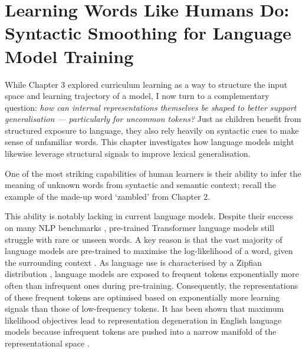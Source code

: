 \chapter{Learning Words Like Humans Do: Syntactic Smoothing for Language Model Training}
\label{chapter:syntactic-smoothing}

While Chapter 3 explored curriculum learning as a way to structure the input space and learning trajectory of a model, I now turn to a complementary question: \emph{how can internal representations themselves be shaped to better support generalisation --- particularly for uncommon tokens?} Just as children benefit from structured exposure to language, they also rely heavily on syntactic cues to make sense of unfamiliar words. This chapter investigates how language models might likewise leverage structural signals to improve lexical generalisation.

One of the most striking capabilities of human learners is their ability to infer the meaning of unknown words from syntactic and semantic context; recall the example of the made-up word `zambled' from Chapter 2.


This ability is notably lacking in current language models. Despite their success on many NLP benchmarks \citep{touvron2023llama, chowdhery2023palm}, pre-trained Transformer language models still struggle with rare or unseen words. A key reason is that the vast majority of language models are pre-trained to maximise the log-likelihood of a word, given the surrounding context \citep{devlin2019bert, brown2020gpt3, chowdhery2023palm, touvron2023llama}. As language use is characterised by a Zipfian distribution \citep{zipf1935zipflaw}, language models are exposed to frequent tokens exponentially more often than infrequent ones during pre-training. Consequently, the representations of these frequent tokens are optimised based on exponentially more learning signals than those of low-frequency tokens. It has been shown that maximum likelihood objectives lead to representation degeneration in English language models because infrequent tokens are pushed into a narrow manifold of the representational space \citep{gao2018representation}. 

